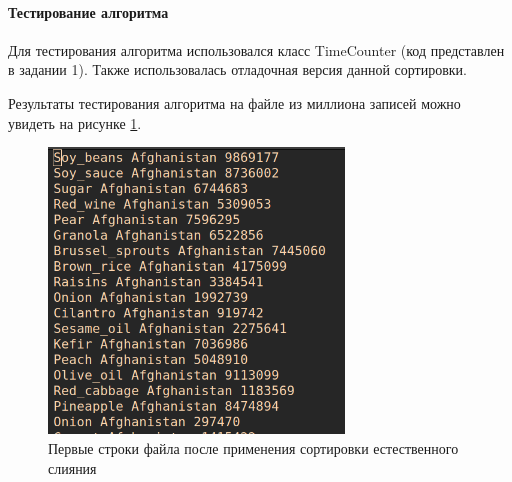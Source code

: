 \documentclass[a4paper, 14pt]{extarticle}
\begin{document}
\paragraph{Тестирование алгоритма}
Для тестирования алгоритма использовался класс TimeCounter (код представлен в задании 1).
Также использовалась отладочная версия данной сортировки.

Результаты тестирования алгоритма на файле из миллиона записей можно
увидеть на рисунке \ref{fig:second_sort_test}.
\begin{figure}[htpb]
  \centering
  \includegraphics[width=0.7\textwidth]{pictures/second_sort_test.png}
  \caption{Первые строки файла после применения сортировки естественного слияния}
  \label{fig:second_sort_test}
\end{figure}

\newpage
\end{document}
